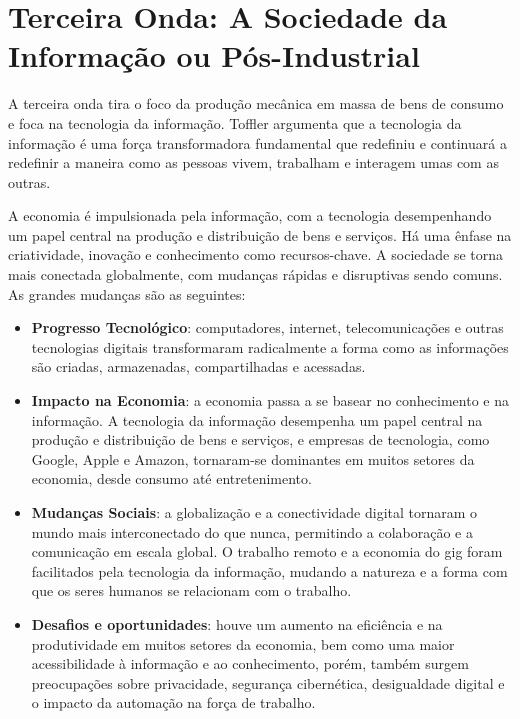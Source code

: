 \section{
    Terceira Onda: A Sociedade da Informação ou Pós-Industrial 
    }

\setlength{\parindent}{4em}
\setlength{\parskip}{0.5em}
\renewcommand{\baselinestretch}{1}

A terceira onda tira o foco da produção mecânica em massa de bens de consumo e foca na tecnologia da informação. Toffler argumenta que a tecnologia da informação é uma força transformadora fundamental que redefiniu e continuará a redefinir a maneira como as pessoas vivem, trabalham e interagem umas com as outras.

A economia é impulsionada pela informação, com a tecnologia desempenhando um papel central na produção e distribuição de bens e serviços. Há uma ênfase na criatividade, inovação e conhecimento como recursos-chave. A sociedade se torna mais conectada globalmente, com mudanças rápidas e disruptivas sendo comuns. As grandes mudanças são as seguintes:

\begin{itemize}
	\item \textbf{Progresso Tecnológico}: computadores, internet, telecomunicações e outras tecnologias digitais transformaram radicalmente a forma como as informações são criadas, armazenadas, compartilhadas e acessadas.
	\item \textbf{Impacto na Economia}: a economia passa a se basear no conhecimento e na informação. A tecnologia da informação desempenha um papel central na produção e distribuição de bens e serviços, e empresas de tecnologia, como Google, Apple e Amazon, tornaram-se dominantes em muitos setores da economia, desde consumo até entretenimento.
	\item \textbf{Mudanças Sociais}: a globalização e a conectividade digital tornaram o mundo mais interconectado do que nunca, permitindo a colaboração e a comunicação em escala global. O trabalho remoto e a economia do gig foram facilitados pela tecnologia da informação, mudando a natureza e a forma com que os seres humanos se relacionam com o trabalho.
	\item \textbf{Desafios e oportunidades}: houve um aumento na eficiência e na produtividade em muitos setores da economia, bem como uma maior acessibilidade à informação e ao conhecimento, porém, também surgem preocupações sobre privacidade, segurança cibernética, desigualdade digital e o impacto da automação na força de trabalho.
\end{itemize}

